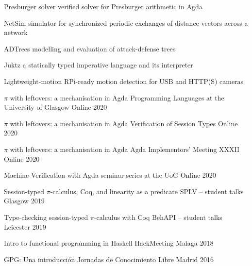 \documentclass[11pt, a4paper]{awesome-cv}
\begin{document}

\begin{cvskills}
    \cvskill
        {Presburger solver}
        {verified solver for Presburger arithmetic in Agda}

    \cvskill
        {NetSim}
        {simulator for synchronized periodic exchanges of distance vectors
        across a network}

    \cvskill
        {ADTrees}
        {modelling and evaluation of attack-defense trees}

    \cvskill
        {Juktz}
        {a statically typed imperative language and its interpreter}

    \cvskill
        {Lightweight-motion}
        {RPi-ready motion detection for USB and HTTP(S) cameras}
\end{cvskills}


\begin{cvhonors}
  \cvhonor
  {$\pi$ with leftovers: a mechanisation in Agda}
  {Programming Languages at the University of Glasgow}
  {Online}
  {2020}

  \cvhonor
  {$\pi$ with leftovers: a mechanisation in Agda}
  {Verification of Session Types}
  {Online}
  {2020}

  \cvhonor
  {$\pi$ with leftovers: a mechanisation in Agda}
  {Agda Implementors' Meeting XXXII}
  {Online}
  {2020}

  \cvhonor
  {Machine Verification with Agda}
  {seminar series at the UoG}
  {Online}
  {2020}

    \cvhonor
      {Session-typed $\pi$-calculus, Coq, and linearity as a predicate}
      {SPLV -- student talks}
      {Glasgow} %
      {2019} %

    \cvhonor
      {Type-checking session-typed $\pi$-calculus with Coq}
      {BehAPI -- student talks}
      {Leicester} %
      {2019} %

    \cvhonor
      {Intro to functional programming in Haskell}
      {HackMeeting}
      {Malaga} %
      {2018} %

    \cvhonor
      {GPG: Una introducción}
      {Jornadas de Conocimiento Libre}
      {Madrid} %
      {2016} %
\end{cvhonors}

\end{document}
